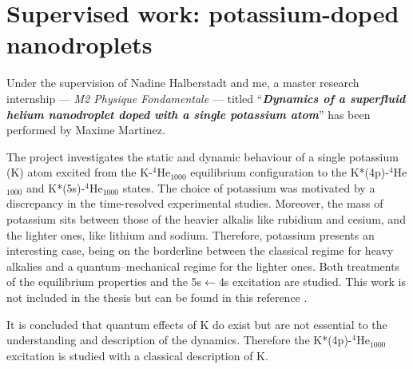 	\section{Supervised work: potassium-doped nanodroplets}
		Under the supervision of Nadine Halberstadt and me, a master research internship --- \emph{M2 Physique Fondamentale} --- titled ``\emph{\textbf{Dynamics of a superfluid helium nanodroplet doped with a single potassium atom}}'' has been performed by Maxime Martinez.
	
		The project investigates the static and dynamic behaviour of a single potassium (K) atom excited from the K-$^4$He$_{1000}$ equilibrium configuration to the K*(4p)-$^4$He$_{1000}$ and K*(5s)-$^4$He$_{1000}$ states. The choice of potassium was motivated by a discrepancy in the time-resolved experimental studies\citep{Schulz2001,Reho2000-1,Reho2000-2}. Moreover, the mass of potassium sits between those of the heavier alkalis like rubidium and cesium, and the lighter ones, like lithium and sodium. Therefore, potassium presents an interesting case, being on the borderline between the classical regime for heavy alkalies and a quantum--mechanical regime for the lighter ones. Both treatments of the equilibrium properties and the 5s$\leftarrow$4s excitation are studied. This work is not included in the thesis but can be found in this reference \citep{Martinez2017}.
		
		It is concluded that quantum effects of K do exist but are not essential to the understanding and description of the dynamics. Therefore the K*(4p)-$^4$He$_{1000}$ excitation is studied with a classical description of K.

